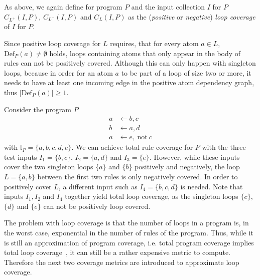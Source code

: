 As above, we again define for program $P$ and the input collection $I$ for $P$ \(C_{L^+}(I, P)\), \(C_{L^-}(I, P)\) and \(C_{L}(I, P)\) as the (\emph{positive} or \emph{negative}) \emph{loop coverage} of $I$ for $P$.

Since positive loop coverage for $L$ requires, that for every atom \(a \in L\), \(\text{Def}_P(a) \neq \emptyset\) holds, loops containing atoms that only appear in the body of rules can not be positively covered. Although this can only happen with singleton loops, because in order for an atom $a$ to be part of a loop of size two or more, it needs to have at least one incoming edge in the positive atom dependency graph, thus \(| \text{Def}_P(a) | \geq 1\).

\begin{example}
\label{ex:loop coverage}
    Consider the program $P$
    \begin{align*}
        a &\leftarrow b, c \\
        b &\leftarrow a, d \\
        a &\leftarrow e,\ \text{not}\ c
    \end{align*}
    with \(\mathbb{I}_P = \{a, b, c, d, e\}\). We can achieve total rule coverage for $P$ with the three test inputs \(I_1 = \{b, c\}\), \(I_2 = \{a, d\}\) and \(I_3 = \{e\}\). However, while these inputs cover the two singleton loops \(\{a\}\) and \(\{b\}\) positively and negatively, the loop \(L = \{a, b\}\) between the first two rules is only negatively covered. In order to positively cover $L$, a different input such as \(I_4 = \{b, c, d\}\) is needed.
    Note that inputs \(I_1, I_2\) and \(I_4\) together yield total loop coverage, as the singleton loops \(\{c\}\), \(\{d\}\) and \(\{e\}\) can not be positively loop covered.
\end{example}

The problem with loop coverage is that the number of loops in a program is, in the worst case, exponential in the number of rules of the program. Thus, while it is still an approximation of program coverage, i.e. total program coverage implies total loop coverage~\cite{Jan+10}, it can still be a rather expensive metric to compute. Therefore the next two coverage metrics are introduced to approximate loop coverage.

